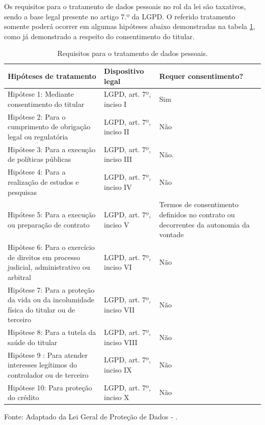 \documentclass[
	12pt,				%
	openright,			%
	oneside,			%
	a4paper,			%
	english,			%
	french,				%
	spanish,			%
	brazil,				%
	]{abntex2}
\begin{document}
Os requisitos para o tratamento de dados pessoais no rol da lei são taxativos, sendo a base legal presente no artigo 7.º da LGPD. O referido tratamento somente poderá ocorrer em algumas hipóteses abaixo demonstradas na tabela \ref{tab: requisitos de tratamento de dados}, como já demonstrado a respeito do consentimento do titular.
\begin{table}[ht]
    \centering
    \caption{Requisitos para o tratamento de dados pessoais.}
    \label{tab: requisitos de tratamento de dados}
    \begin{tabular}{|p{5.5 cm}|p{4.5cm}|p{5.5cm}|} 
        \hline
        \textbf{Hipóteses de tratamento} & \textbf{Dispositivo legal} & \textbf{Requer consentimento?} \\ \hline
        
         Hipótese 1: Mediante consentimento do titular & LGPD, art. 7º, inciso I & Sim \\ \hline
         
        Hipótese 2: Para o cumprimento de obrigação legal ou regulatória & LGPD, art. 7º, inciso II & Não  \\ \hline
        
        Hipótese 3: Para a execução de políticas públicas
 & LGPD, art. 7º, inciso III & Não. \\ \hline
 
        Hipótese 4: Para a realização de estudos e pesquisas & LGPD, art. 7º, inciso IV & Não  \\ \hline
        
        Hipótese 5: Para a execução ou preparação de contrato & LGPD, art. 7º, inciso V & Termos de consentimento definidos no contrato ou decorrentes da autonomia da vontade  \\ \hline
        
        Hipótese 6: Para o exercício de direitos em processo judicial, administrativo ou arbitral & LGPD, art. 7º, inciso VI & Não  \\ \hline
        
        Hipótese 7: Para a proteção da vida ou da incolumidade física do titular ou de terceiro & LGPD, art. 7º, inciso VII & Não  \\ \hline
        
        Hipótese 8: Para a tutela da saúde do titular & LGPD, art. 7º, inciso VIII & Não  \\ \hline
        
        Hipótese 9 : Para atender interesses legítimos do controlador ou de terceiro & LGPD, art. 7º, inciso IX & Não  \\ \hline
        
        Hipótese 10: Para proteção do crédito & LGPD, art. 7º, inciso X & Não  \\ \hline
    \end{tabular}
    \newline \newline Fonte: Adaptado da Lei Geral de Proteção de Dados - .
\end{table}
\end{document}

